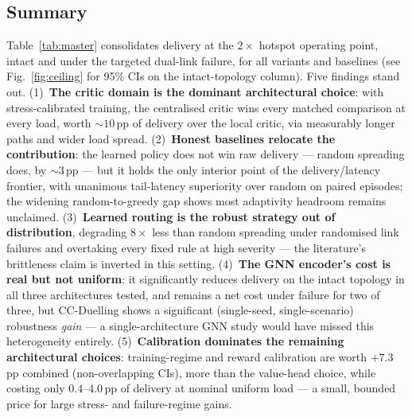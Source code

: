 \documentclass[10pt,journal,comsoc]{IEEEtran}
\begin{document}
\subsection{Summary}
\label{sec:summary}
Table~\ref{tab:master} consolidates delivery at the $2\times$ hotspot operating point, intact and under the targeted dual-link failure, for all variants and baselines (see Fig.~\ref{fig:ceiling} for 95\% CIs on the intact-topology column). Five findings stand out. (1)~\textbf{The critic domain is the dominant architectural choice}: with stress-calibrated training, the centralised critic wins every matched comparison at every load, worth ${\sim}10$\,pp of delivery over the local critic, via measurably longer paths and wider load spread. (2)~\textbf{Honest baselines relocate the contribution}: the learned policy does not win raw delivery --- random spreading does, by ${\sim}3$\,pp --- but it holds the only interior point of the delivery/latency frontier, with unanimous tail-latency superiority over random on paired episodes; the widening random-to-greedy gap shows most adaptivity headroom remains unclaimed. (3)~\textbf{Learned routing is the robust strategy out of distribution}, degrading $8\times$ less than random spreading under randomised link failures and overtaking every fixed rule at high severity --- the literature's brittleness claim is inverted in this setting. (4)~\textbf{The GNN encoder's cost is real but not uniform}: it significantly reduces delivery on the intact topology in all three architectures tested, and remains a net cost under failure for two of three, but CC-Duelling shows a significant (single-seed, single-scenario) robustness \emph{gain} --- a single-architecture GNN study would have missed this heterogeneity entirely. (5)~\textbf{Calibration dominates the remaining architectural choices}: training-regime and reward calibration are worth $+7.3$\,pp combined (non-overlapping CIs), more than the value-head choice, while costing only $0.4$--$4.0$\,pp of delivery at nominal uniform load --- a small, bounded price for large stress- and failure-regime gains.
\end{document}
